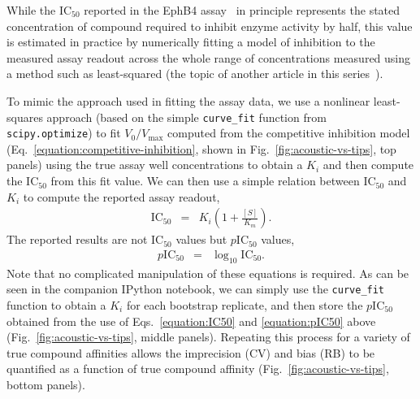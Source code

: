 \documentclass[aps,pre,twocolumn,nofootinbib,superscriptaddress,linenumbers]{revtex4-1}
\begin{document}
While the IC$_{50}$ reported in the EphB4 assay~\cite{ekins_dispensing_2013,barlaam_novel_2009,barlaam_pyrimidine_2010} in principle represents the stated concentration of compound required to inhibit enzyme activity by half, this value is estimated in practice by numerically fitting a model of inhibition to the measured assay readout across the whole range of concentrations measured using a method such as least-squared (the topic of another article in this series~\cite{jones_fitting_2015}).

To mimic the approach used in fitting the assay data, we use a nonlinear least-squares approach (based on the simple {\tt curve\_fit} function from {\tt scipy.optimize}) to fit $V_0 / V_\mathrm{max}$ computed from the competitive inhibition model (Eq.~\ref{equation:competitive-inhibition}, shown in Fig.~\ref{fig:acoustic-vs-tips}, top panels) using the true assay well concentrations to obtain a $K_i$ and then compute the IC$_{50}$ from this fit value.
We can then use a simple relation between IC$_{50}$ and $K_{i}$ to compute the reported assay readout,
\begin{eqnarray}
\mathrm{IC}_{50} &=& K_{i}\left(1+\frac{[S]}{K_{m}}\right) \label{equation:IC50} .
\end{eqnarray} 
The reported results are not IC$_{50}$ values but $p$IC$_{50}$ values, 
\begin{eqnarray}
p\mathrm{IC}_{50} &=& \log_{10} \mathrm{IC}_{50} \label{equation:pIC50} .
\end{eqnarray}
Note that no complicated manipulation of these equations is required.
As can be seen in the companion IPython notebook, we can simply use the {\tt curve\_fit} function to obtain a $K_i$ for each bootstrap replicate, and then store the $p$IC$_{50}$ obtained from the use of Eqs.~\ref{equation:IC50} and \ref{equation:pIC50} above (Fig.~\ref{fig:acoustic-vs-tips}, middle panels).
Repeating this process for a variety of true compound affinities allows the imprecision (CV) and bias (RB) to be quantified as a function of true compound affinity (Fig.~\ref{fig:acoustic-vs-tips}, bottom panels).
\end{document}

